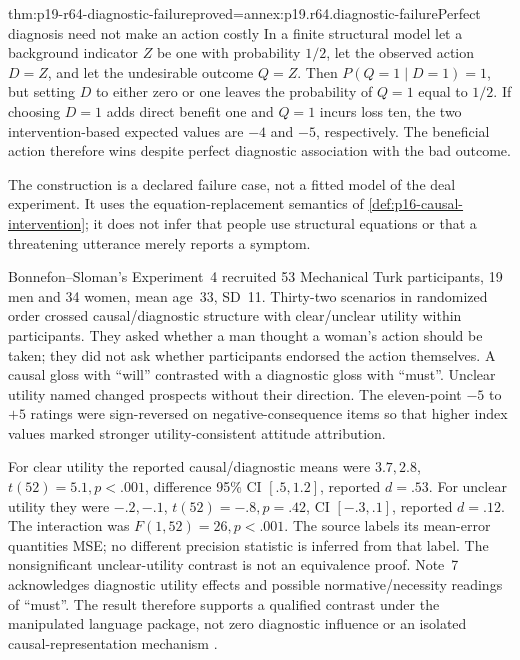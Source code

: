\begin{hblemma}{thm:p19-r64-diagnostic-failure}{proved=annex:p19.r64.diagnostic-failure}{Perfect diagnosis need not make an action costly}
In a finite structural model let a background indicator \(Z\) be one
with probability \(1/2\), let the observed action \(D=Z\), and let
the undesirable outcome \(Q=Z\). Then \(P(Q=1\mid D=1)=1\),
but setting \(D\) to either zero or one leaves the probability of
\(Q=1\) equal to \(1/2\). If choosing \(D=1\) adds direct benefit
one and \(Q=1\) incurs loss ten, the two intervention-based expected
values are \(-4\) and \(-5\), respectively. The beneficial action
therefore wins despite perfect diagnostic association with the bad outcome.
\end{hblemma}

The construction is a declared failure case, not a fitted model of the
deal experiment. It uses the equation-replacement semantics of
\cref{def:p16-causal-intervention}; it does not infer that people use
structural equations or that a threatening utterance merely reports a symptom.

Bonnefon--Sloman's Experiment~4 recruited 53 Mechanical Turk participants,
19 men and 34 women, mean age~33, SD~11. Thirty-two scenarios in randomized
order crossed causal/diagnostic structure with clear/unclear utility within
participants. They asked whether a man thought a woman's action should
be taken; they did not ask whether participants endorsed the action themselves.
A causal gloss with ``will'' contrasted with a diagnostic gloss with
``must''. Unclear utility named changed prospects without their direction.
The eleven-point \(-5\) to \(+5\) ratings were sign-reversed on
negative-consequence items so that higher index values marked stronger
utility-consistent attitude attribution.

For clear utility the reported causal/diagnostic means were \(3.7,2.8\),
\(t(52)=5.1,p<.001\), difference 95\% CI \([.5,1.2]\),
reported \(d=.53\). For unclear utility they were \(-.2,-.1\),
\(t(52)=-.8,p=.42\), CI \([-.3,.1]\), reported \(d=.12\).
The interaction was \(F(1,52)=26,p<.001\). The source labels its
mean-error quantities MSE; no different precision statistic is inferred
from that label. The nonsignificant unclear-utility contrast is not an
equivalence proof. Note~7 acknowledges diagnostic utility effects and
possible normative/necessity readings of ``must''. The result therefore
supports a qualified contrast under the manipulated language package,
not zero diagnostic influence or an isolated causal-representation mechanism
\cite[pp.~201--203,206, note~7]{BonnefonSloman2013Causal}.

